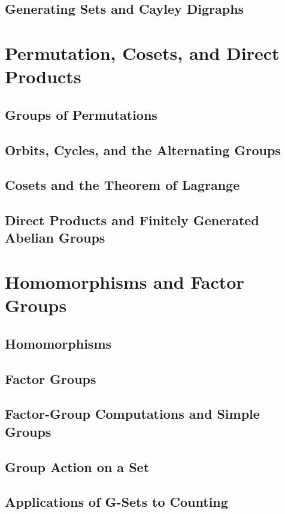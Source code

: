 \documentclass[11pt]{article}
\begin{document}
\subsection{Generating Sets and Cayley Digraphs}






\section{Permutation, Cosets, and Direct Products}
\setcounter{subsection}{7}
\subsection{Groups of Permutations}
\subsection{Orbits, Cycles, and the Alternating Groups}
\subsection{Cosets and the Theorem of Lagrange}
\subsection{Direct Products and Finitely Generated Abelian Groups}


\section{Homomorphisms and Factor Groups}
\setcounter{subsection}{12}
\subsection{Homomorphisms}
\subsection{Factor Groups}
\subsection{Factor-Group Computations and Simple Groups}
\subsection{Group Action on a Set}
\subsection{Applications of G-Sets to Counting}
\end{document}
